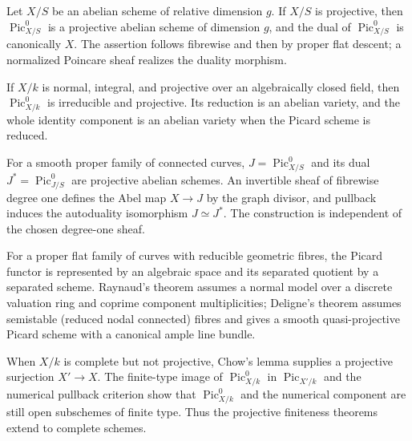 \begin{remark}\label{fga-rem-9-5-24}\uses{}
Let $X/S$ be an abelian scheme of relative dimension $g$.  If $X/S$ is
projective, then $\operatorname{Pic}^0_{X/S}$ is a projective abelian scheme of
dimension $g$, and the dual of $\operatorname{Pic}^0_{X/S}$ is canonically $X$.
The assertion follows fibrewise and then by proper flat descent; a normalized
Poincare sheaf realizes the duality morphism.
\end{remark}

\begin{remark}\label{fga-rem-9-5-25}
If $X/k$ is normal, integral, and projective over an algebraically closed field,
then $\operatorname{Pic}^0_{X/k}$ is irreducible and projective.  Its reduction
is an abelian variety, and the whole identity component is an abelian variety
when the Picard scheme is reduced.
\end{remark}

\begin{remark}\label{fga-rem-9-5-26}\uses{}
For a smooth proper family of connected curves, $J=\operatorname{Pic}^0_{X/S}$
and its dual $J^*=\operatorname{Pic}^0_{J/S}$ are projective abelian schemes.
An invertible sheaf of fibrewise degree one defines the Abel map
$X\to J$ by the graph divisor, and pullback induces the autoduality isomorphism
$J\simeq J^*$.  The construction is independent of the chosen degree-one sheaf.
\end{remark}

\begin{remark}\label{fga-rem-9-5-27}\uses{}
For a proper flat family of curves with reducible geometric fibres, the Picard
functor is represented by an algebraic space and its separated quotient by a
separated scheme.  Raynaud's theorem assumes a normal model over a discrete
valuation ring and coprime component multiplicities; Deligne's theorem assumes
semistable (reduced nodal connected) fibres and gives a smooth quasi-projective
Picard scheme with a canonical ample line bundle.
\end{remark}

\begin{remark}\label{fga-rem-9-6-14}
When $X/k$ is complete but not projective, Chow's lemma supplies a projective
surjection $X'\to X$.  The finite-type image of $\operatorname{Pic}^0_{X/k}$ in
$\operatorname{Pic}_{X'/k}$ and the numerical pullback criterion show that
$\operatorname{Pic}^0_{X/k}$ and the numerical component are still open
subschemes of finite type.  Thus the projective finiteness theorems extend to
complete schemes.
\end{remark}

